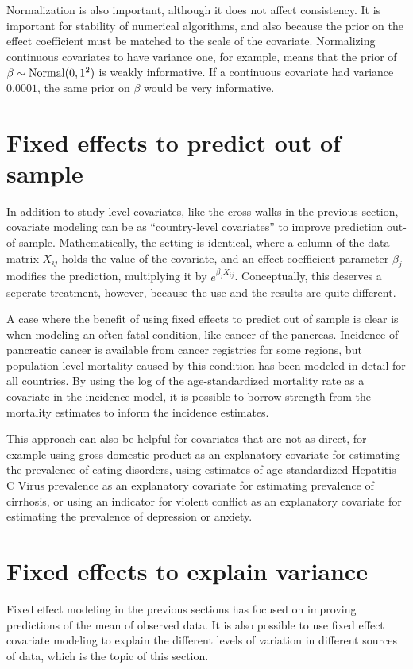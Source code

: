 Normalization is also important, although it does not affect
consistency.  It is important for stability of numerical algorithms,
and also because the prior on the effect coefficient must be matched
to the scale of the covariate.  Normalizing continuous covariates to
have variance one, for example, means that the prior of
$\beta\sim\operatorname{Normal}(0,1^2)$ is weakly informative.  If a continuous
covariate had variance $0.0001$, the same prior on $\beta$ would be
very informative.

\section{Fixed effects to predict out of sample}

In addition to study-level covariates, like the cross-walks in the
previous section, covariate modeling can be as ``country-level
covariates'' to improve prediction out-of-sample.  Mathematically, the
setting is identical, where a column of the data matrix $X_{ij}$ holds
the value of the covariate, and an effect coefficient parameter
$\beta_j$ modifies the prediction, multiplying it by
$e^{\beta_j X_{ij}}$.  Conceptually, this deserves a seperate treatment,
  however, because the use and the results are quite different.

A case where the benefit of using fixed effects to predict out of
sample is clear is when modeling an often fatal condition, like cancer
of the pancreas.  Incidence of pancreatic cancer is available from
cancer registries for some regions, but population-level mortality
caused by this condition has been modeled in detail for all
countries.  By using the log of the age-standardized mortality rate as a
covariate in the incidence model, it is possible to borrow strength
from the mortality estimates to inform the incidence estimates.

This approach can also be helpful for covariates that are not as
direct, for example using gross domestic product as an explanatory
covariate for estimating the prevalence of eating disorders, using
estimates of age-standardized Hepatitis C Virus prevalence as an
explanatory covariate for estimating prevalence of cirrhosis, or using
an indicator for violent conflict as an explanatory covariate for
estimating the prevalence of depression or anxiety.



\section{Fixed effects to explain variance}
Fixed effect modeling in the previous sections has focused on
improving predictions of the mean of observed data.  It is also
possible to use fixed effect covariate modeling to explain the
different levels of variation in different sources of data, which is
the topic of this section.


